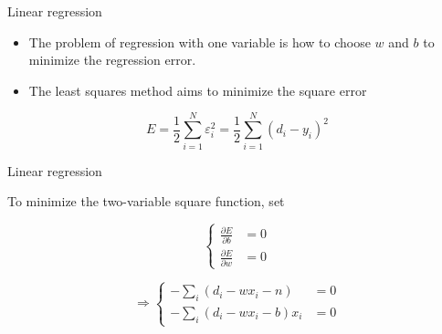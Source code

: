 \documentclass[notes]{beamer}
\providecommand{\tightlist}{%
  \setlength{\itemsep}{0pt}\setlength{\parskip}{0pt}}
\begin{document}
\begin{frame}{Linear regression}

\begin{itemize}
\tightlist
\item
  The problem of regression with one variable is how to choose \(w\) and
  \(b\) to minimize the regression error.
\item
  The least squares method aims to minimize the square error
\end{itemize}

\[E=\frac{1}{2}\sum_{i=1}^{N} \varepsilon_i^2 = \frac{1}{2} \sum_{i=1}^{N} (d_i -y_i)^2\]

\end{frame}

\begin{frame}{Linear regression}

To minimize the two-variable square function, set

\[\left\{\begin{array}{cc}
\frac{\partial E}{\partial b} & =0 \\ 
\frac{\partial E}{\partial w} & =0 
\end{array} \right.\]

\[\Rightarrow \left\{\begin{array}{cc}
-\sum_{i}(d_i -wx_i -n) & =0 \\  
-\sum_{i} (d_i -wx_i -b) x_i & =0 
\end{array} \right.\]

\end{frame}
\end{document}
